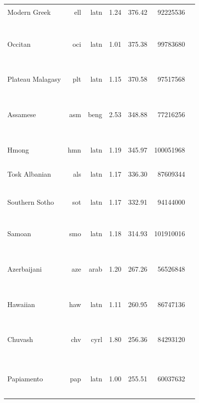\documentclass[11pt]{article}
\begin{document}
\begin{center}
\begin{longtable}[width=0.9\textwidth]{|lrrrrrl|}
Modern Greek & ell & latn & 1.24 & 376.42 & 92225536 & {\color{madlad400}\rule{4.0cm}{8pt}} \\ 
Occitan & oci & latn & 1.01 & 375.38 & 99783680 & {\color{oscar}\rule{0.03cm}{8pt}}{\color{nllb}\rule{1.08cm}{8pt}}{\color{madlad400}\rule{1.02cm}{8pt}}{\color{glot500}\rule{1.35cm}{8pt}}{\color{other}\rule{0.52cm}{8pt}} \\ 
Plateau Malagasy & plt & latn & 1.15 & 370.58 & 97517568 & {\color{nllb}\rule{3.83cm}{8pt}}{\color{glot500}\rule{0.16999999999999993cm}{8pt}} \\ 
Assamese & asm & beng & 2.53 & 348.88 & 77216256 & {\color{oscar}\rule{0.21cm}{8pt}}{\color{nllb}\rule{0.76cm}{8pt}}{\color{madlad400}\rule{1.03cm}{8pt}}{\color{glot500}\rule{1.79cm}{8pt}}{\color{other}\rule{0.20999999999999996cm}{8pt}} \\ 
Hmong & hmn & latn & 1.19 & 345.97 & 100051968 & {\color{madlad400}\rule{2.18cm}{8pt}}{\color{glot500}\rule{1.8199999999999998cm}{8pt}} \\ 
Tosk Albanian & als & latn & 1.17 & 336.30 & 87609344 & {\color{glot500}\rule{3.42cm}{8pt}}{\color{other}\rule{0.5800000000000001cm}{8pt}} \\ 
Southern Sotho & sot & latn & 1.17 & 332.91 & 94144000 & {\color{nllb}\rule{1.31cm}{8pt}}{\color{madlad400}\rule{1.33cm}{8pt}}{\color{glot500}\rule{1.36cm}{8pt}}{\color{other}\rule{0.0cm}{8pt}} \\ 
Samoan & smo & latn & 1.18 & 314.93 & 101910016 & {\color{nllb}\rule{0.97cm}{8pt}}{\color{madlad400}\rule{1.74cm}{8pt}}{\color{glot500}\rule{1.29cm}{8pt}}{\color{other}\rule{0.0cm}{8pt}} \\ 
Azerbaijani & aze & arab & 1.20 & 267.26 & 56526848 & {\color{oscar}\rule{0.23cm}{8pt}}{\color{nllb}\rule{0.91cm}{8pt}}{\color{glot500}\rule{2.02cm}{8pt}}{\color{other}\rule{0.8399999999999999cm}{8pt}} \\ 
Hawaiian & haw & latn & 1.11 & 260.95 & 86747136 & {\color{madlad400}\rule{2.12cm}{8pt}}{\color{glot500}\rule{1.76cm}{8pt}}{\color{other}\rule{0.1200000000000001cm}{8pt}} \\ 
Chuvash & chv & cyrl & 1.80 & 256.36 & 84293120 & {\color{oscar}\rule{0.13cm}{8pt}}{\color{madlad400}\rule{0.99cm}{8pt}}{\color{glot500}\rule{0.57cm}{8pt}}{\color{other}\rule{2.31cm}{8pt}} \\ 
Papiamento & pap & latn & 1.00 & 255.51 & 60037632 & {\color{nllb}\rule{1.02cm}{8pt}}{\color{madlad400}\rule{2.73cm}{8pt}}{\color{glot500}\rule{0.21cm}{8pt}}{\color{other}\rule{0.040000000000000036cm}{8pt}} \\ 

\end{longtable}
\end{center}
\end{document}
